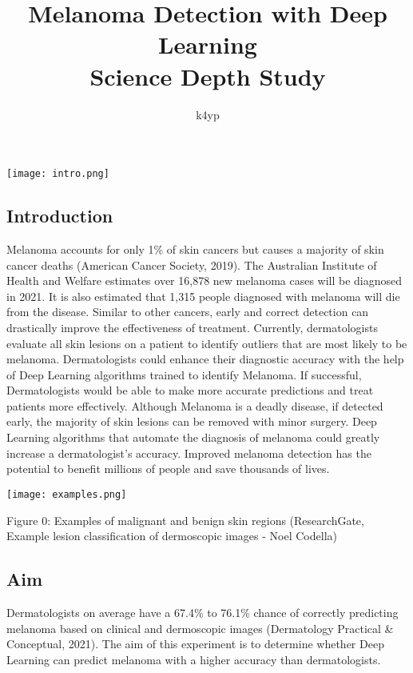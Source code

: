 \documentclass{article}
\begin{document}
\title {\textbf{Melanoma Detection with Deep Learning} \\[1ex] \large Science Depth Study}
\author{k4yp}
\date{}
\maketitle
\vspace{1in}
\begin{center}
\texttt{[image: intro.png]}
\end{center}
\newpage

\renewcommand{\baselinestretch}{2}\normalsize
\tableofcontents
\renewcommand{\baselinestretch}{1.1}\normalsize

\newpage

\subsection{Introduction}
Melanoma accounts for only 1\% of skin cancers but causes a majority of skin cancer deaths (American Cancer Society, 2019).  The Australian Institute of Health and Welfare estimates over 16,878 new melanoma cases will be diagnosed in 2021. It is also estimated that 1,315 people diagnosed with melanoma will die from the disease. Similar to other cancers, early and correct detection can drastically improve the effectiveness of treatment. Currently, dermatologists evaluate all skin lesions on a patient to identify outliers that are most likely to be melanoma. Dermatologists could enhance their diagnostic accuracy with the help of Deep Learning algorithms trained to identify Melanoma. If successful, Dermatologists would be able to make more accurate predictions and treat patients more effectively. Although Melanoma is a deadly disease, if detected early, the majority of skin lesions can be removed with minor surgery. Deep Learning algorithms that automate the diagnosis of melanoma could greatly increase a dermatologist's accuracy. Improved melanoma detection has the potential to benefit millions of people and save thousands of lives.

\begin{center}
\texttt{[image: examples.png]}
\end{center}
Figure 0: Examples of malignant and benign skin regions (ResearchGate, Example lesion classification of dermoscopic images - Noel Codella)

\subsection{Aim}
Dermatologists on average have a 67.4\% to 76.1\% chance of correctly predicting melanoma based on clinical and dermoscopic images (Dermatology Practical & Conceptual, 2021). The aim of this experiment is to determine whether Deep Learning can predict melanoma with a higher accuracy than dermatologists.
\end{document}
